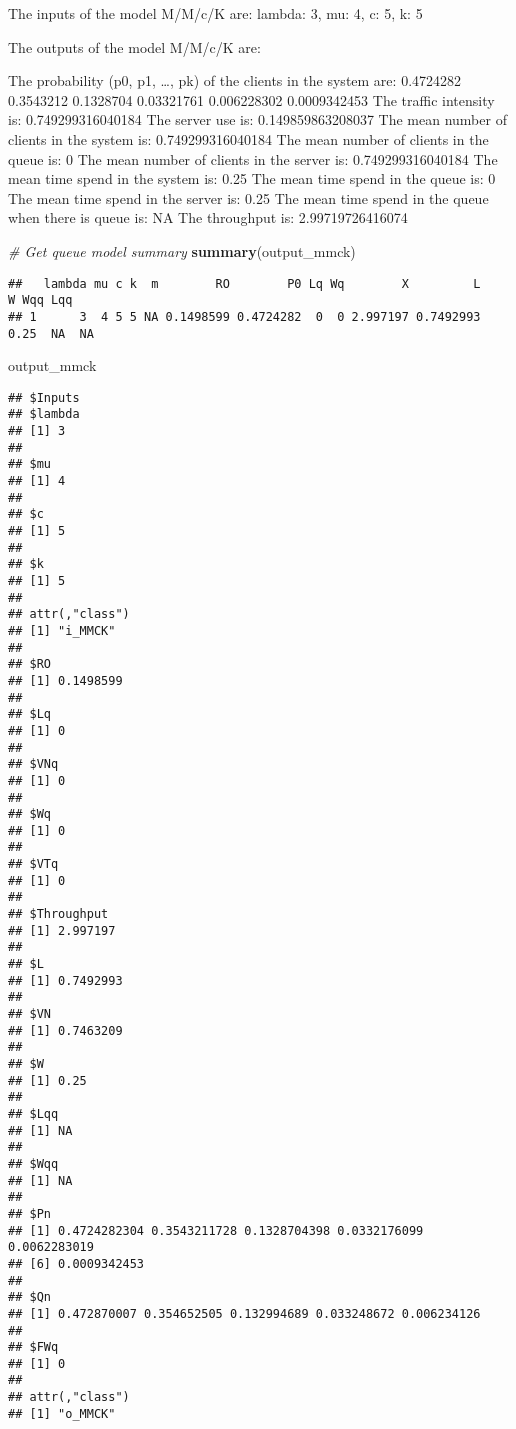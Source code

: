 \documentclass[
]{article}
\newenvironment{Shaded}{\begin{snugshade}}{\end{snugshade}}
\newcommand{\CommentTok}[1]{\textcolor[rgb]{0.56,0.35,0.01}{\textit{#1}}}
\newcommand{\KeywordTok}[1]{\textcolor[rgb]{0.13,0.29,0.53}{\textbf{#1}}}
\newcommand{\NormalTok}[1]{#1}
\begin{document}
The inputs of the model M/M/c/K are: lambda: 3, mu: 4, c: 5, k: 5

The outputs of the model M/M/c/K are:

The probability (p0, p1, \ldots, pk) of the clients in the system are:
0.4724282 0.3543212 0.1328704 0.03321761 0.006228302 0.0009342453 The
traffic intensity is: 0.749299316040184 The server use is:
0.149859863208037 The mean number of clients in the system is:
0.749299316040184 The mean number of clients in the queue is: 0 The mean
number of clients in the server is: 0.749299316040184 The mean time
spend in the system is: 0.25 The mean time spend in the queue is: 0 The
mean time spend in the server is: 0.25 The mean time spend in the queue
when there is queue is: NA The throughput is: 2.99719726416074

\begin{Shaded}
\begin{Highlighting}[]
\CommentTok{# Get queue model summary}
\KeywordTok{summary}\NormalTok{(output_mmck)}
\end{Highlighting}
\end{Shaded}

\begin{verbatim}
##   lambda mu c k  m        RO        P0 Lq Wq        X         L    W Wqq Lqq
## 1      3  4 5 5 NA 0.1498599 0.4724282  0  0 2.997197 0.7492993 0.25  NA  NA
\end{verbatim}

\begin{Shaded}
\begin{Highlighting}[]
\NormalTok{output_mmck}
\end{Highlighting}
\end{Shaded}

\begin{verbatim}
## $Inputs
## $lambda
## [1] 3
## 
## $mu
## [1] 4
## 
## $c
## [1] 5
## 
## $k
## [1] 5
## 
## attr(,"class")
## [1] "i_MMCK"
## 
## $RO
## [1] 0.1498599
## 
## $Lq
## [1] 0
## 
## $VNq
## [1] 0
## 
## $Wq
## [1] 0
## 
## $VTq
## [1] 0
## 
## $Throughput
## [1] 2.997197
## 
## $L
## [1] 0.7492993
## 
## $VN
## [1] 0.7463209
## 
## $W
## [1] 0.25
## 
## $Lqq
## [1] NA
## 
## $Wqq
## [1] NA
## 
## $Pn
## [1] 0.4724282304 0.3543211728 0.1328704398 0.0332176099 0.0062283019
## [6] 0.0009342453
## 
## $Qn
## [1] 0.472870007 0.354652505 0.132994689 0.033248672 0.006234126
## 
## $FWq
## [1] 0
## 
## attr(,"class")
## [1] "o_MMCK"
\end{verbatim}
\end{document}
